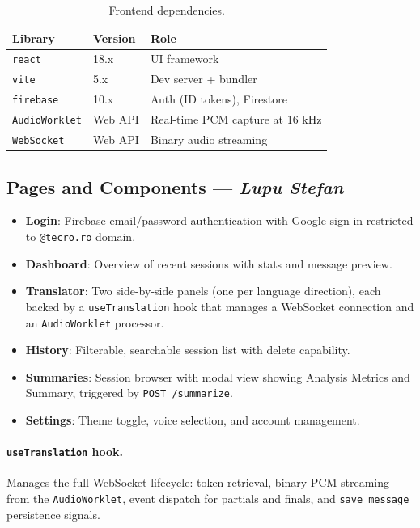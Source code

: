 \documentclass[12pt,a4paper]{report}
\begin{document}
\begin{table}[H]
  \centering
  \begin{tabular}{lll}
    \toprule
    \textbf{Library} & \textbf{Version} & \textbf{Role} \\
    \midrule
    \texttt{react}           & 18.x & UI framework \\
    \texttt{vite}            & 5.x  & Dev server + bundler \\
    \texttt{firebase}        & 10.x & Auth (ID tokens), Firestore \\
    \texttt{AudioWorklet}    & Web API & Real-time PCM capture at 16 kHz \\
    \texttt{WebSocket}       & Web API & Binary audio streaming \\
    \bottomrule
  \end{tabular}
  \caption{Frontend dependencies.}
\end{table}

\subsection{Pages and Components — \textit{Lupu Stefan}}

\begin{itemize}
  \item \textbf{Login}: Firebase email/password authentication with
        Google sign-in restricted to \texttt{@tecro.ro} domain.
  \item \textbf{Dashboard}: Overview of recent sessions with stats and
        message preview.
  \item \textbf{Translator}: Two side-by-side panels (one per language
        direction), each backed by a \texttt{useTranslation} hook that
        manages a WebSocket connection and an \texttt{AudioWorklet}
        processor.
  \item \textbf{History}: Filterable, searchable session list with
        delete capability.
  \item \textbf{Summaries}: Session browser with modal view showing
        Analysis Metrics and Summary, triggered by \texttt{POST /summarize}.
  \item \textbf{Settings}: Theme toggle, voice selection, and account
        management.
\end{itemize}

\paragraph{\texttt{useTranslation} hook.}
Manages the full WebSocket lifecycle: token retrieval, binary PCM
streaming from the \texttt{AudioWorklet}, event dispatch for partials
and finals, and \texttt{save\_message} persistence signals.
\end{document}
